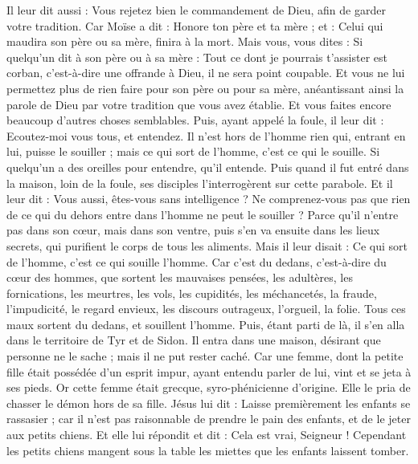 \begin{multicols}{2}
Il leur dit aussi : Vous rejetez bien le commandement de Dieu, afin de garder votre tradition.
Car Moïse a dit : Honore ton père et ta mère ; et : Celui qui maudira son père ou sa mère, finira à la mort.
Mais vous, vous dites : Si quelqu'un dit à son père ou à sa mère : Tout ce dont je pourrais t'assister est corban, c'est-à-dire une offrande à Dieu, il ne sera point coupable.
Et vous ne lui permettez plus de rien faire pour son père ou pour sa mère,
anéantissant ainsi la parole de Dieu par votre tradition que vous avez établie. Et vous faites encore beaucoup d'autres choses semblables.
Puis, ayant appelé la foule, il leur dit : Ecoutez-moi vous tous, et entendez.
Il n'est hors de l'homme rien qui, entrant en lui, puisse le souiller ; mais ce qui sort de l'homme, c'est ce qui le souille.
Si quelqu'un a des oreilles pour entendre, qu'il entende.
Puis quand il fut entré dans la maison, loin de la foule, ses disciples l'interrogèrent sur cette parabole.
Et il leur dit : Vous aussi, êtes-vous sans intelligence ? Ne comprenez-vous pas que rien de ce qui du dehors entre dans l'homme ne peut le souiller ?
Parce qu'il n'entre pas dans son cœur, mais dans son ventre, puis s'en va ensuite dans les lieux secrets, qui purifient le corps de tous les aliments.
Mais il leur disait : Ce qui sort de l'homme, c'est ce qui souille l'homme.
Car c'est du dedans, c'est-à-dire du cœur des hommes, que sortent les mauvaises pensées, les adultères, les fornications, les meurtres,
les vols, les cupidités, les méchancetés, la fraude, l'impudicité, le regard envieux, les discours outrageux, l'orgueil, la folie.
Tous ces maux sortent du dedans, et souillent l'homme.
Puis, étant parti de là, il s'en alla dans le territoire de Tyr et de Sidon. Il entra dans une maison, désirant que personne ne le sache ; mais il ne put rester caché.
Car une femme, dont la petite fille était possédée d'un esprit impur, ayant entendu parler de lui, vint et se jeta à ses pieds.
Or cette femme était grecque, syro-phénicienne d'origine. Elle le pria de chasser le démon hors de sa fille. Jésus lui dit :
Laisse premièrement les enfants se rassasier ; car il n'est pas raisonnable de prendre le pain des enfants, et de le jeter aux petits chiens.
Et elle lui répondit et dit : Cela est vrai, Seigneur ! Cependant les petits chiens mangent sous la table les miettes que les enfants laissent tomber.

\end{multicols}
